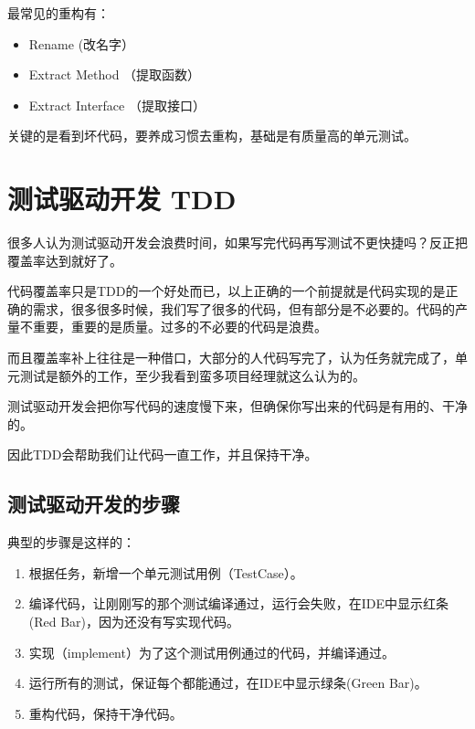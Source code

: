 最常见的重构有：

\begin{itemize}
\item Rename (改名字）

\item Extract Method （提取函数）

\item Extract Interface （提取接口）

\end{itemize}

关键的是看到坏代码，要养成习惯去重构，基础是有质量高的单元测试。 

\section{测试驱动开发 TDD}
\label{测试驱动开发tdd}

很多人认为测试驱动开发会浪费时间，如果写完代码再写测试不更快捷吗？反正把覆盖率达到就好了。

代码覆盖率只是TDD的一个好处而已，以上正确的一个前提就是代码实现的是正确的需求，很多很多时候，我们写了很多的代码，但有部分是不必要的。代码的产量不重要，重要的是质量。过多的不必要的代码是浪费。

而且覆盖率补上往往是一种借口，大部分的人代码写完了，认为任务就完成了，单元测试是额外的工作，至少我看到蛮多项目经理就这么认为的。

测试驱动开发会把你写代码的速度慢下来，但确保你写出来的代码是有用的、干净的。

因此TDD会帮助我们让代码一直工作，并且保持干净。

\subsection{测试驱动开发的步骤}
\label{测试驱动开发的步骤}

典型的步骤是这样的：

\begin{enumerate}
\item 根据任务，新增一个单元测试用例（TestCase）。

\item 编译代码，让刚刚写的那个测试编译通过，运行会失败，在IDE中显示红条(Red Bar)，因为还没有写实现代码。

\item 实现（implement）为了这个测试用例通过的代码，并编译通过。

\item 运行所有的测试，保证每个都能通过，在IDE中显示绿条(Green Bar)。

\item 重构代码，保持干净代码。

\end{enumerate}

